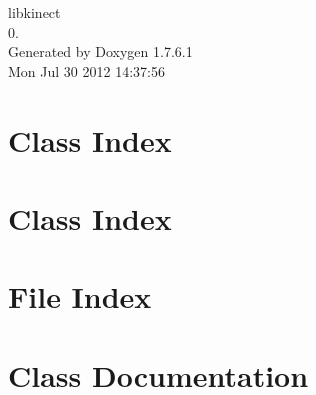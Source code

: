 \documentclass[a4paper]{book}
\begin{document}
\hypersetup{pageanchor=false,citecolor=blue}
\begin{titlepage}
\vspace*{7cm}
\begin{center}
{\Large libkinect \\[1ex]\large 0. }\\
\vspace*{1cm}
{\large \-Generated by Doxygen 1.7.6.1}\\
\vspace*{0.5cm}
{\small Mon Jul 30 2012 14:37:56}\\
\end{center}
\end{titlepage}
\clearemptydoublepage
{}
\tableofcontents
\clearemptydoublepage
{}
\hypersetup{pageanchor=true,citecolor=blue}
\chapter{\-Class \-Index}

\chapter{\-Class \-Index}

\chapter{\-File \-Index}

\chapter{\-Class \-Documentation}
















































\end{document}
